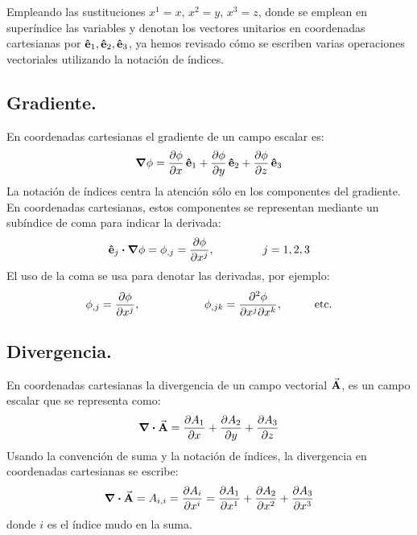 \documentclass[hidelinks,12pt]{article}
\begin{document}
Empleando las sustituciones $x^{1} = x, \, x^{2} = y, \, x^{3} = z$, donde se emplean en superíndice las variables y denotan los vectores unitarios en coordenadas cartesianas por $\vu{e}_{1}, \vu{e}_{2}, \vu{e}_{3}$, ya hemos revisado cómo se escriben varias operaciones vectoriales utilizando la notación de índices.

\subsection{Gradiente.}

En coordenadas cartesianas el gradiente de un campo escalar es:
\begin{align*}
\grad{\phi} = \pdv{\phi}{x} \, \vu{e}_{1} + \pdv{\phi}{y} \, \vu{e}_{2} + \pdv{\phi}{z} \, \vu{e}_{3}
\end{align*}
La notación de índices centra la atención sólo en los componentes del gradiente. En coordenadas cartesianas, estos componentes se representan mediante un subíndice de coma para indicar la derivada:
\begin{align*}
\vu{e}_{j} \vdot \grad{\phi} = \phi_{,j} = \pdv{\phi}{x^{j}}, \hspace{1.5cm} j = 1, 2, 3
\end{align*}
El uso de la coma se usa para denotar las derivadas, por ejemplo:
\begin{align*}
\phi_{,j} = \pdv{\phi}{x^{j}}, \hspace{2cm} \phi_{,jk} = \pdv[2]{\phi}{x^{j}}{x^{k}}, \hspace{1cm} \text{etc.}
\end{align*}

\subsection{Divergencia.}

En coordenadas cartesianas la divergencia de un campo vectorial $\va{A}$, es un campo escalar que se representa como:
\begin{align*}
\div{\va{A}} = \pdv{A_{1}}{x} + \pdv{A_{2}}{y} + \pdv{A_{3}}{z}
\end{align*}
Usando la convención de suma y la notación de índices, la divergencia en coordenadas cartesianas se escribe:
\begin{align*}
\div{\va{A}} = A_{i,i} = \pdv{A_{i}}{x^{i}} = \pdv{A_{1}}{x^{1}} + \pdv{A_{2}}{x^{2}} + \pdv{A_{3}}{x^{3}}
\end{align*}
donde $i$ es el índice mudo en la suma.
\end{document}
